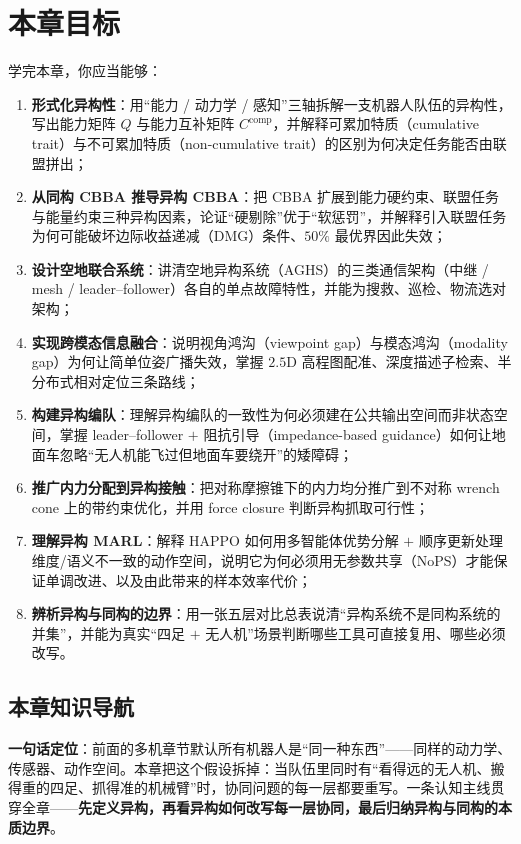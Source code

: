 \section*{本章目标}
学完本章，你应当能够：
\begin{enumerate}
  \item \textbf{形式化异构性}：用“能力 / 动力学 / 感知”三轴拆解一支机器人队伍的异构性，写出能力矩阵 $Q$ 与能力互补矩阵 $C^{\mathrm{comp}}$，并解释可累加特质（cumulative trait）与不可累加特质（non-cumulative trait）的区别为何决定任务能否由联盟拼出；
  \item \textbf{从同构 CBBA 推导异构 CBBA}：把 CBBA 扩展到能力硬约束、联盟任务与能量约束三种异构因素，论证“硬剔除”优于“软惩罚”，并解释引入联盟任务为何可能破坏边际收益递减（DMG）条件、$50\%$ 最优界因此失效；
  \item \textbf{设计空地联合系统}：讲清空地异构系统（AGHS）的三类通信架构（中继 / mesh / leader--follower）各自的单点故障特性，并能为搜救、巡检、物流选对架构；
  \item \textbf{实现跨模态信息融合}：说明视角鸿沟（viewpoint gap）与模态鸿沟（modality gap）为何让简单位姿广播失效，掌握 $2.5\mathrm{D}$ 高程图配准、深度描述子检索、半分布式相对定位三条路线；
  \item \textbf{构建异构编队}：理解异构编队的一致性为何必须建在公共输出空间而非状态空间，掌握 leader--follower $+$ 阻抗引导（impedance-based guidance）如何让地面车忽略“无人机能飞过但地面车要绕开”的矮障碍；
  \item \textbf{推广内力分配到异构接触}：把对称摩擦锥下的内力均分推广到不对称 wrench cone 上的带约束优化，并用 force closure 判断异构抓取可行性；
  \item \textbf{理解异构 MARL}：解释 HAPPO 如何用多智能体优势分解 $+$ 顺序更新处理维度/语义不一致的动作空间，说明它为何必须用无参数共享（NoPS）才能保证单调改进、以及由此带来的样本效率代价；
  \item \textbf{辨析异构与同构的边界}：用一张五层对比总表说清“异构系统不是同构系统的并集”，并能为真实“四足 $+$ 无人机”场景判断哪些工具可直接复用、哪些必须改写。
\end{enumerate}

\subsection*{本章知识导航}
\textbf{一句话定位}：前面的多机章节默认所有机器人是“同一种东西”——同样的动力学、传感器、动作空间。本章把这个假设拆掉：当队伍里同时有“看得远的无人机、搬得重的四足、抓得准的机械臂”时，协同问题的每一层都要重写。一条认知主线贯穿全章——\textbf{先定义异构，再看异构如何改写每一层协同，最后归纳异构与同构的本质边界}。

